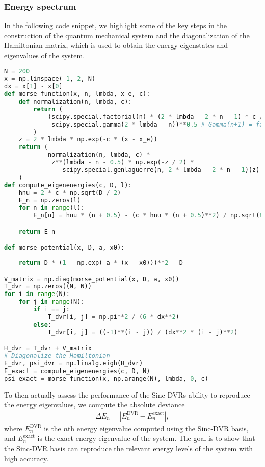 \documentclass{subfiles}
\begin{document}
\subsubsection*{Energy spectrum} 
In the following code snippet, we highlight some of the key steps in the construction of the quantum mechanical system and the diagonalization of the Hamiltonian matrix, which is used to obtain the energy eigenstates and eigenvalues of the system. 
\begin{lstlisting}[language=Python, label=lst:dvr_validation]
N = 200
x = np.linspace(-1, 2, N)
dx = x[1] - x[0]
def morse_function(x, n, lmbda, x_e, c):
    def normalization(n, lmbda, c):
        return (
            (scipy.special.factorial(n) * (2 * lmbda - 2 * n - 1) * c /
             scipy.special.gamma(2 * lmbda - n))**0.5 # Gamma(n+1) = factorial(n)
        )
    z = 2 * lmbda * np.exp(-c * (x - x_e))
    return (
            normalization(n, lmbda, c) *
             z**(lmbda - n - 0.5) * np.exp(-z / 2) * 
                scipy.special.genlaguerre(n, 2 * lmbda - 2 * n - 1)(z)
    )
def compute_eigenenergies(c, D, l):
    hnu = 2 * c * np.sqrt(D / 2)
    E_n = np.zeros(l)
    for n in range(l):
        E_n[n] = hnu * (n + 0.5) - (c * hnu * (n + 0.5)**2) / np.sqrt(8 * D)

    return E_n

def morse_potential(x, D, a, x0):
    
    return D * (1 - np.exp(-a * (x - x0)))**2 - D

V_matrix = np.diag(morse_potential(x, D, a, x0))
T_dvr = np.zeros((N, N))
for i in range(N):
    for j in range(N):
        if i == j:
            T_dvr[i, j] = np.pi**2 / (6 * dx**2)
        else:
            T_dvr[i, j] = ((-1)**(i - j)) / (dx**2 * (i - j)**2)

H_dvr = T_dvr + V_matrix
# Diagonalize the Hamiltonian
E_dvr, psi_dvr = np.linalg.eigh(H_dvr)
E_exact = compute_eigenenergies(c, D, N)
psi_exact = morse_function(x, np.arange(N), lmbda, 0, c)
\end{lstlisting}
To then actually assess the performance of the Sinc-DVRs ability to reproduce the energy eigenvalues, we compute the absolute deviance
\begin{align*}
    \Delta E_n = |E_n^{\text{DVR}} - E_n^{\text{exact}}|,
\end{align*}
where $E_n^{\text{DVR}}$ is the $n$th energy eigenvalue computed using the Sinc-DVR basis, and $E_n^{\text{exact}}$ is the exact energy eigenvalue of the system. The goal is to show that the Sinc-DVR basis can reproduce the relevant energy levels of the system with high accuracy.
\end{document}
